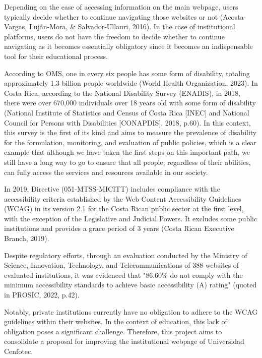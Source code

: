 \documentclass{article}
\begin{document}
Depending on the ease of accessing information on the main webpage, users typically decide whether to continue navigating those websites or not (Acosta-Vargas, Luján-Mora, \& Salvador-Ullauri, 2016). In the case of institutional platforms, users do not have the freedom to decide whether to continue navigating as it becomes essentially obligatory since it becomes an indispensable tool for their educational process.

According to OMS, one in every six people has some form of disability, totaling approximately 1.3 billion people worldwide (World Health Organization, 2023). In Costa Rica, according to the National Disability Survey (ENADIS), in 2018, there were over 670,000 individuals over 18 years old with some form of disability (National Institute of Statistics and Census of Costa Rica [INEC] and National Council for Persons with Disabilities [CONAPDIS], 2018, p.60). In this context, this survey is the first of its kind and aims to measure the prevalence of disability for the formulation, monitoring, and evaluation of public policies, which is a clear example that although we have taken the first steps on this important path, we still have a long way to go to ensure that all people, regardless of their abilities, can fully access the services and resources available in our society.

In 2019, Directive (051-MTSS-MICITT) includes compliance with the accessibility criteria established by the Web Content Accessibility Guidelines (WCAG) in its version 2.1 for the Costa Rican public sector at the first level, with the exception of the Legislative and Judicial Powers. It excludes some public institutions and provides a grace period of 3 years (Costa Rican Executive Branch, 2019).

Despite regulatory efforts, through an evaluation conducted by the Ministry of Science, Innovation, Technology, and Telecommunications of 388 websites of evaluated institutions, it was evidenced that "86.60\% do not comply with the minimum accessibility standards to achieve basic accessibility (A) rating" (quoted in PROSIC, 2022, p.42).

Notably, private institutions currently have no obligation to adhere to the WCAG guidelines within their websites. In the context of education, this lack of obligation poses a significant challenge. Therefore, this project aims to consolidate a proposal for improving the institutional webpage of Universidad Cenfotec.
\end{document}
